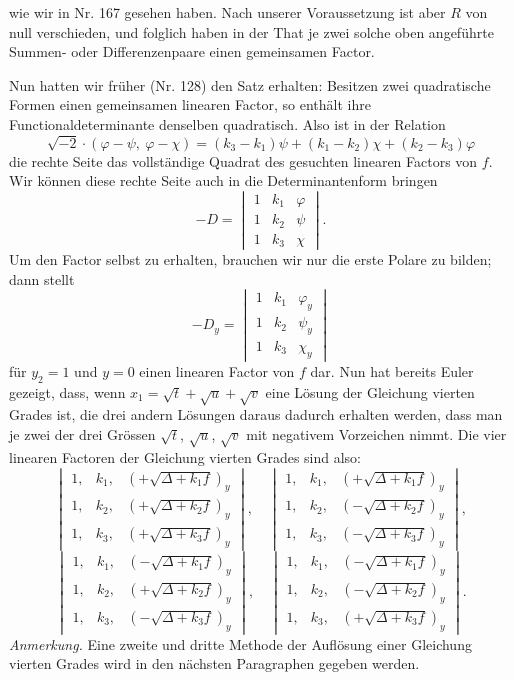 \documentclass[11pt]{article}
\providecommand{\weberpage}[1]{}
\let\Delta\varDelta
\begin{document}
\weberpage{195}
wie wir in Nr. 167 gesehen haben. Nach unserer Voraussetzung ist aber $R$ von null verschieden, und folglich haben in der That je zwei solche oben angeführte Summen- oder Differenzenpaare einen gemeinsamen Factor.

Nun hatten wir früher (Nr. 128) den Satz erhalten: Besitzen zwei quadratische Formen einen gemeinsamen linearen Factor, so enthält ihre Functionaldeterminante denselben quadratisch. Also ist in der Relation
\[
\sqrt{-2}\cdot(\varphi-\psi,\ \varphi-\chi) = (k_3-k_1)\psi+(k_1-k_2)\chi+(k_2-k_3)\varphi
\]
die rechte Seite das vollständige Quadrat des gesuchten linearen Factors von $f$. Wir können diese rechte Seite auch in die Determinantenform bringen
\[
-D = \begin{vmatrix} 1 & k_1 & \varphi \\ 1 & k_2 & \psi \\ 1 & k_3 & \chi \end{vmatrix}.
\]
Um den Factor selbst zu erhalten, brauchen wir nur die erste Polare zu bilden; dann stellt
\[
-D_y = \begin{vmatrix} 1 & k_1 & \varphi_y \\ 1 & k_2 & \psi_y \\ 1 & k_3 & \chi_y \end{vmatrix}
\]
für $y_2=1$ und $y=0$ einen linearen Factor von $f$ dar. Nun hat bereits Euler gezeigt, dass, wenn $x_1=\sqrt{t}+\sqrt{u}+\sqrt{v}$ eine Lösung der Gleichung vierten Grades ist, die drei andern Lösungen daraus dadurch erhalten werden, dass man je zwei der drei Grössen $\sqrt{t}$, $\sqrt{u}$, $\sqrt{v}$ mit negativem Vorzeichen nimmt. Die vier linearen Factoren der Gleichung vierten Grades sind also:
\[
\begin{vmatrix} 1, & k_1, & (+\sqrt{\Delta+k_1f})_y \\ 1, & k_2, & (+\sqrt{\Delta+k_2f})_y \\ 1, & k_3, & (+\sqrt{\Delta+k_3f})_y \end{vmatrix},
\quad
\begin{vmatrix} 1, & k_1, & (+\sqrt{\Delta+k_1f})_y \\ 1, & k_2, & (-\sqrt{\Delta+k_2f})_y \\ 1, & k_3, & (-\sqrt{\Delta+k_3f})_y \end{vmatrix},
\]
\[
\begin{vmatrix} 1, & k_1, & (-\sqrt{\Delta+k_1f})_y \\ 1, & k_2, & (+\sqrt{\Delta+k_2f})_y \\ 1, & k_3, & (-\sqrt{\Delta+k_3f})_y \end{vmatrix},
\quad
\begin{vmatrix} 1, & k_1, & (-\sqrt{\Delta+k_1f})_y \\ 1, & k_2, & (-\sqrt{\Delta+k_2f})_y \\ 1, & k_3, & (+\sqrt{\Delta+k_3f})_y \end{vmatrix}.
\]
\textit{Anmerkung.} Eine zweite und dritte Methode der Auflösung einer Gleichung vierten Grades wird in den nächsten Paragraphen gegeben werden.
\end{document}
